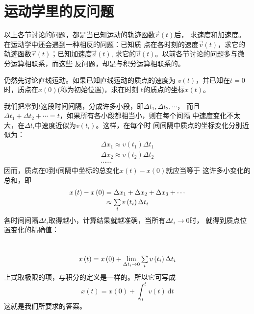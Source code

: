 \section{运动学里的反问题}\label{sec:01.11}

以上各节讨论的问题，都是当已知运动的轨迹函数$\vec{r}\left(t\right)$后，
求速度和加速度。在运动学中还会遇到一种相反的问题：已知质
点在各时刻的速度$\vec{v}\left(t\right)$，求它的轨迹函数$\vec{r}\left(t\right)$；已知加速度$\vec{a}\left(t\right)$,
求它的$\vec{v}\left(t\right)$。以前各节讨论的问题多与微分运算相联系，而这些
反问题，却是与积分运算相联系的。

仍然先讨论直线运动。如果已知直线运动的质点的速度为
$v\left(t\right)$，并已知在$t=0$时，质点在$x\left(0\right)$(称为初始位置)，求在时刻
t的质点的坐标$x\left(t\right)$。

我们把零到$t$这段时间间隔，分成许多小段，即$\Delta t_1 , \Delta t_2 , \cdots$，
而且$\Delta t_1+\Delta t_2+\cdots=t$，如果所有各小段都相当小，则在每个间隔
中速度变化不太大，在$\Delta t_i$中速度近似为$v\left(t_i\right)$。这样，在每个时
间间隔中质点的坐标变化分别近似为：
\begin{equation*}
  \begin{array}{l}
    \Delta x_{1} \approx v\left(t_{1}\right) \Delta t_{1} \\[-1pt]
    \Delta x_{2} \approx v\left(t_{2}\right) \Delta t_{2} \\[-1pt]
    \cdots \cdots
  \end{array}
\end{equation*}
因而，质点在0到$t$间隔中坐标的总变化$x\left(t\right)-x\left(0\right)$就应当等于
这许多小变化的总和，即\vspace{-0.5em}
\begin{equation}\label{eqn:01.11.01}
  \begin{aligned}
    x\left(t\right)-x\left(0\right) & =\Delta x_{1}+\Delta x_{2}+\Delta x_{3}+\cdots    \\[-1pt]
                                    & \approx \textstyle\sum\limits_{i} v\left(t_{i}\right) \Delta t_{i}
  \end{aligned}
\end{equation}
各时间间隔$\Delta t_i$取得越小，计算结果就越准确，当所有$\Delta t_i\rightarrow 0$时，
就得到质点位置变化的精确值：

~\vspace{-1.56em}
\begin{equation}\label{eqn:01.11.02}
  x\left(t\right)=x\left(0\right)+\lim _{\Delta t_{i} \rightarrow 0} \textstyle\sum\limits_{i} v\left(t_{i}\right) \Delta t_{i}
\end{equation}
上式取极限的项，与积分的定义是一样的。所以它可写成
\begin{equation}\label{eqn:01.11.03}
  x\left(t\right)=x\left(0\right)+\int_{0}^{t} v\left(t\right) {~\mathrm d}  t
\end{equation}
这就是我们所要求的答案。

